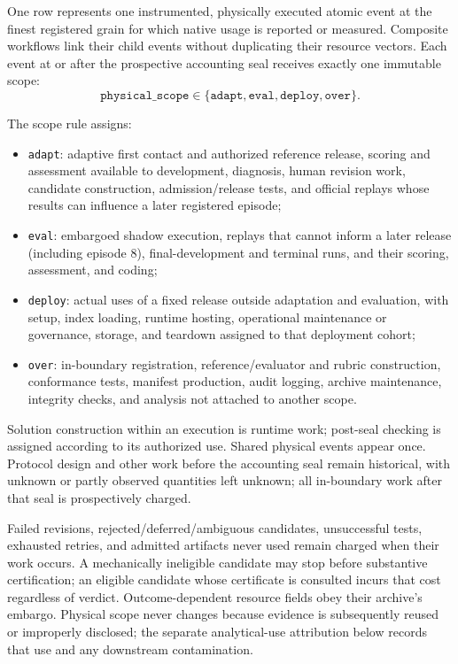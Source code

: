 \documentclass[10pt]{article} %
\providecommand{\1}{\mathbf{1}}  %
\theoremstyle{remark}
\theoremstyle{definition}
\begin{document}
One row represents one instrumented, physically executed atomic event at
the finest registered grain for which native usage is reported or
measured. Composite workflows link their child events without duplicating
their resource vectors. Each event at or after the
prospective accounting seal receives exactly one immutable scope:
\begin{equation}
\texttt{physical\_scope}
\in\{\texttt{adapt},\texttt{eval},\texttt{deploy},\texttt{over}\}.
\end{equation}

The scope rule assigns:
\begin{itemize}[leftmargin=*,itemsep=3pt,topsep=3pt]
\item \texttt{adapt}: adaptive first contact and authorized reference release,
scoring and assessment available to development, diagnosis, human revision
work, candidate construction, admission/release tests, and official replays
whose results can influence a later registered episode;
\item \texttt{eval}: embargoed shadow execution, replays that cannot inform a
later release (including episode 8), final-development and terminal runs,
and their scoring, assessment, and coding;
\item \texttt{deploy}: actual uses of a fixed release outside adaptation and
evaluation, with setup, index loading, runtime hosting, operational maintenance
or governance, storage, and teardown assigned to that deployment cohort;
\item \texttt{over}: in-boundary registration, reference/evaluator and rubric
construction, conformance tests, manifest production, audit logging, archive
maintenance, integrity checks, and analysis not attached to another scope.
\end{itemize}
Solution construction within an execution is runtime work; post-seal checking
is assigned according to its authorized use. Shared physical events appear
once. Protocol design and other work before the accounting seal remain
historical, with unknown or partly observed quantities left unknown; all
in-boundary work after that seal is prospectively charged.

Failed revisions, rejected/deferred/ambiguous candidates, unsuccessful tests,
exhausted retries, and admitted artifacts never used remain charged when
their work occurs. A mechanically ineligible candidate may stop before
substantive certification; an eligible candidate whose certificate is
consulted incurs that cost regardless of verdict. Outcome-dependent resource
fields obey their archive's embargo. Physical scope never changes because evidence is subsequently reused
or improperly disclosed; the separate analytical-use attribution below
records that use and any downstream contamination.
\end{document}
